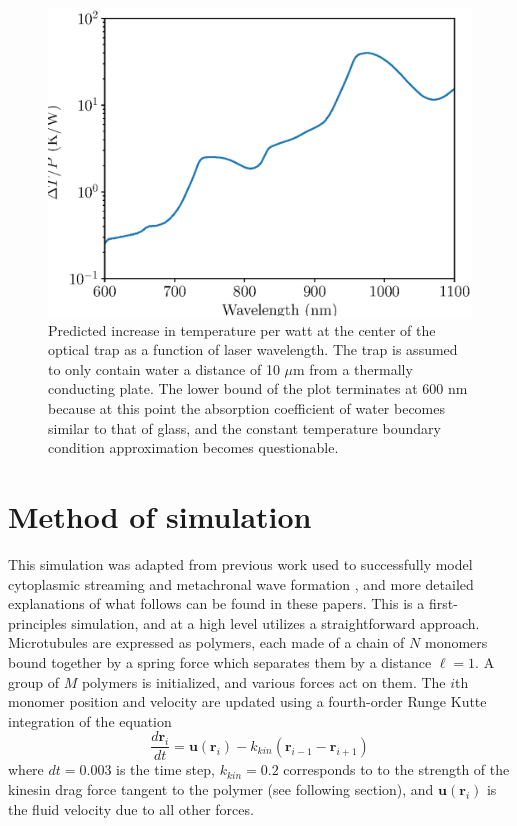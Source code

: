 \documentclass[11pt]{ucthesis}
\begin{document}
\begin{figure}
\begin{center}
\includegraphics[width = \columnwidth]{TvsWL}
\caption{Predicted increase in temperature per watt at the center of the optical trap as a function of laser wavelength. The trap is assumed to only contain water a distance of 10 $\mu$m from a thermally conducting plate. The lower bound of the plot terminates at 600 nm because at this point the absorption coefficient of water becomes similar to that of glass, and the constant temperature boundary condition approximation becomes questionable.\label{fig:TvsWL}}
\end{center}
\end{figure}

\section{Method of simulation}

This simulation was adapted from previous work used to successfully model cytoplasmic streaming and metachronal wave formation \cite{Monteith2016,martin2018emergence}, and more detailed explanations of what follows can be found in these papers. This is a first-principles simulation, and at a high level utilizes a straightforward approach. Microtubules are expressed as polymers, each made of a chain of $N$ monomers bound together by a spring force which separates them by a distance $\ell = 1$. A group of $M$ polymers is initialized, and various forces act on them. The $i$th monomer position and velocity are updated using a fourth-order Runge Kutte integration of the equation
\begin{equation}
\label{eq:RKint}
\frac{d\mathbf{r}_i}{dt} = \mathbf{u}(\mathbf{r}_i) - k_{kin}(\mathbf{r}_{i-1} - \mathbf{r}_{i+1})
\end{equation}
where $dt = 0.003$ is the time step, $k_{kin}=0.2$ corresponds to to the strength of the kinesin drag force tangent to the polymer (see following section), and $\mathbf{u}(\mathbf{r}_i)$ is the fluid velocity due to all other forces.
\end{document}
